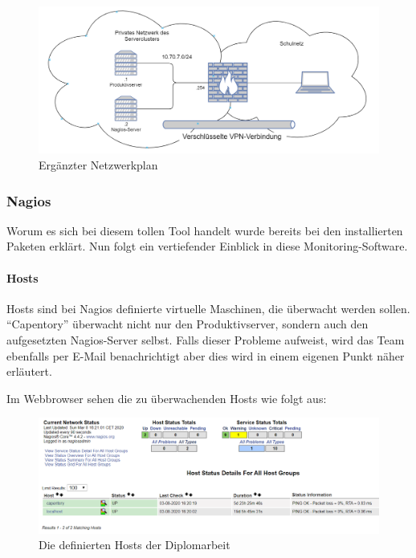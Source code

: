 \begin{figure}[ht]
\centering
\includegraphics{neutopo.png}
\caption{Ergänzter Netzwerkplan}
\end{figure}

\hypertarget{nagios-1}{%
\subsubsection{Nagios}\label{nagios-1}}

Worum es sich bei diesem tollen Tool handelt wurde bereits bei den
installierten Paketen  erklärt. Nun folgt ein vertiefender
Einblick in diese Monitoring-Software.

\hypertarget{hosts}{%
\paragraph{Hosts}\label{hosts}}

Hosts sind bei Nagios definierte virtuelle Maschinen, die überwacht
werden sollen. ``Capentory'' überwacht nicht nur den Produktivserver,
sondern auch den aufgesetzten Nagios-Server selbst. Falls dieser
Probleme aufweist, wird das Team ebenfalls per E-Mail benachrichtigt
aber dies wird in einem eigenen Punkt  näher
erläutert.

Im Webbrowser sehen die zu überwachenden Hosts wie folgt aus:

\begin{figure}[ht]
\centering
\includegraphics{hosts.png}
\caption{Die definierten Hosts der Diplomarbeit}
\end{figure}

